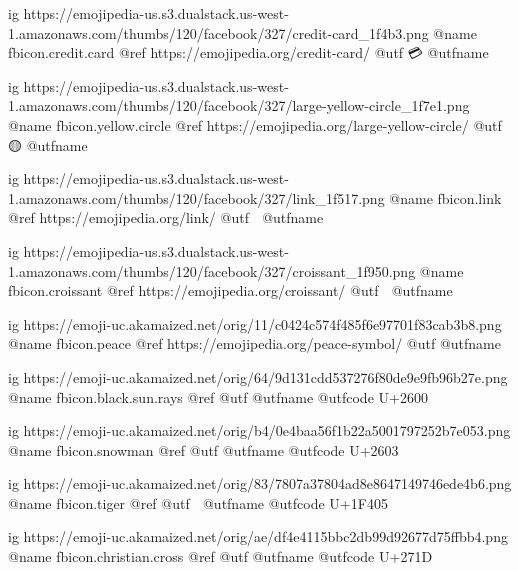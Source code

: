	ig https://emojipedia-us.s3.dualstack.us-west-1.amazonaws.com/thumbs/120/facebook/327/credit-card_1f4b3.png
	@name fbicon.credit.card
	@ref https://emojipedia.org/credit-card/
	@utf 💳
	@utfname

	ig https://emojipedia-us.s3.dualstack.us-west-1.amazonaws.com/thumbs/120/facebook/327/large-yellow-circle_1f7e1.png
	@name fbicon.yellow.circle
	@ref https://emojipedia.org/large-yellow-circle/
	@utf 🟡
	@utfname

	ig https://emojipedia-us.s3.dualstack.us-west-1.amazonaws.com/thumbs/120/facebook/327/link_1f517.png
	@name fbicon.link
	@ref https://emojipedia.org/link/
	@utf 🔗
	@utfname

	ig https://emojipedia-us.s3.dualstack.us-west-1.amazonaws.com/thumbs/120/facebook/327/croissant_1f950.png
	@name fbicon.croissant
	@ref https://emojipedia.org/croissant/
	@utf 🥐
	@utfname

	ig https://emoji-uc.akamaized.net/orig/11/c0424c574f485f6e97701f83cab3b8.png
	@name fbicon.peace
	@ref https://emojipedia.org/peace-symbol/
	@utf
	@utfname

	ig https://emoji-uc.akamaized.net/orig/64/9d131cdd537276f80de9e9fb96b27e.png
	@name fbicon.black.sun.rays
	@ref
	@utf
	@utfname
	@utfcode U+2600

	ig https://emoji-uc.akamaized.net/orig/b4/0e4baa56f1b22a5001797252b7e053.png
	@name fbicon.snowman
	@ref
	@utf
	@utfname
	@utfcode U+2603

	ig https://emoji-uc.akamaized.net/orig/83/7807a37804ad8e8647149746ede4b6.png
	@name fbicon.tiger
	@ref
	@utf 🐅
	@utfname
	@utfcode U+1F405

	ig https://emoji-uc.akamaized.net/orig/ae/df4e4115bbc2db99d92677d75ffbb4.png
	@name fbicon.christian.cross
	@ref
	@utf
	@utfname
	@utfcode U+271D

\fi

